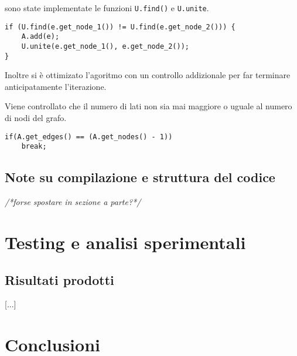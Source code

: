 \documentclass[]{article}
\begin{document}
\begin{flushleft}
\smallskip
sono state implementate le funzioni \verb|U.find()| e \verb|U.unite|.

\lstset{language=c++, style=mystyle, firstnumber=2} 	 	
\begin{lstlisting}
if (U.find(e.get_node_1()) != U.find(e.get_node_2())) {
	A.add(e);
    U.unite(e.get_node_1(), e.get_node_2());
}
\end{lstlisting}

\medskip
Inoltre si è ottimizato l'agoritmo con un controllo addizionale per far terminare anticipatamente l'iterazione. 

Viene controllato che il numero di lati non sia mai maggiore o uguale al numero di nodi del grafo.

\lstset{language=c++, style=mystyle, firstnumber=6}
\begin{lstlisting}
if(A.get_edges() == (A.get_nodes() - 1))
    break;
\end{lstlisting}
\end{flushleft}
\subsection{Note su compilazione e struttura del codice}
\textit{/*forse spostare in sezione a parte?*/}
\section{Testing e analisi sperimentali}
\subsection{Risultati prodotti}
[...]
\section{Conclusioni}
\end{document}
